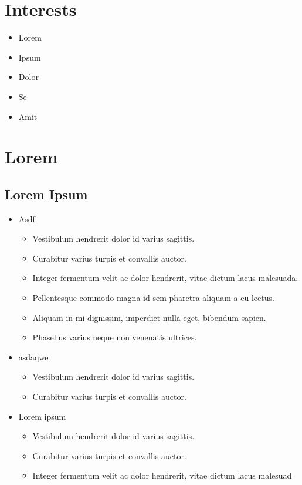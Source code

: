 \documentclass[11pt,oneside]{article}
\begin{document}
\setlength{\fboxsep}{5pt}

\section*{Interests}

\begin{itemize}[noitemsep]
\item Lorem
\item Ipsum
\item Dolor
\item Se
\item Amit
\end{itemize}

\section*{Lorem}

\subsection*{Lorem Ipsum}


\begin{itemize}[leftmargin=*]
\item Asdf
\begin{itemize}
\item Vestibulum hendrerit dolor id varius sagittis.
\item Curabitur varius turpis et convallis auctor.
\item Integer fermentum velit ac dolor hendrerit, vitae dictum lacus malesuada.
\item Pellentesque commodo magna id sem pharetra aliquam a eu lectus.
\item Aliquam in mi dignissim, imperdiet nulla eget, bibendum sapien.
\item Phasellus varius neque non venenatis ultrices.
\end{itemize}
\end{itemize}

\begin{itemize}[leftmargin=*]
\item asdaqwe
\begin{itemize}
\item Vestibulum hendrerit dolor id varius sagittis.
\item Curabitur varius turpis et convallis auctor.
\end{itemize}
\end{itemize}

\begin{itemize}[leftmargin=*]
\item Lorem ipsum
\begin{itemize}
\item Vestibulum hendrerit dolor id varius sagittis.
\item Curabitur varius turpis et convallis auctor.
\item Integer fermentum velit ac dolor hendrerit, vitae dictum lacus malesuad
\end{itemize}
\end{itemize}
\end{document}
